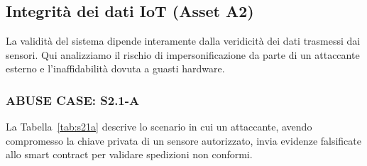 \subsection{Integrità dei dati IoT (Asset A2)}
La validità del sistema dipende interamente dalla veridicità dei dati trasmessi dai sensori. Qui analizziamo il rischio di impersonificazione da parte di un attaccante esterno e l'inaffidabilità dovuta a guasti hardware.

\subsubsection*{ABUSE CASE: S2.1-A}
La Tabella~\ref{tab:s21a} descrive lo scenario in cui un attaccante, avendo compromesso la chiave privata di un sensore autorizzato, invia evidenze falsificate allo smart contract per validare spedizioni non conformi.

